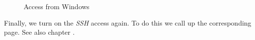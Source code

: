 \documentclass[12pt,a4paper]{article}
\newcommand{\jpaimg}[2]{\begin{figure}[H]\centering\fbox{\texttt{[image: \#1]}}\caption{#2}\label{fig:#2}\end{figure}}
\begin{document}
\jpaimg{./../images/win-bb.png}{Access from Windows}

Finally, we turn on the \textit{SSH} access again. To do this we call up the corresponding page. See also chapter .

\clearpage{}
\listoffigures\thispagestyle{fancy}
\newpage


\renewcommand{\indexname}{Index}
\clearpage{}
\printindex\thispagestyle{fancy}
\newpage
\end{document}

